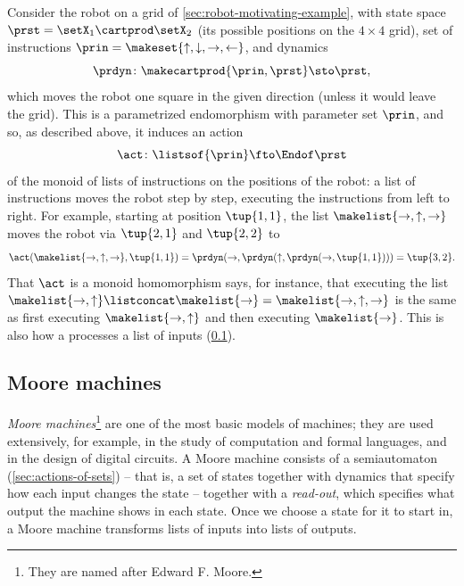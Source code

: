 \begin{example}
    \label{exa:robot-list-action}
    Consider the robot on a grid of \cref{sec:robot-motivating-example}, with state space $\prst = \setX_1 \cartprod \setX_2$ (its possible positions on the $4 \times 4$ grid), set of instructions $\prin = \makeset{\uparrow, \downarrow, \rightarrow, \leftarrow}$, and dynamics
    \begin{equation}
        \prdyn \colon \makecartprod{\prin, \prst} \sto \prst,
    \end{equation}
    which moves the robot one square in the given direction (unless it would leave the grid).
    This is a parametrized endomorphism with parameter set $\prin$, and so, as described above, it induces an action
    \begin{equation}
        \act \colon \listsof{\prin} \fto \Endof\prst
    \end{equation}
    of the monoid of lists of instructions on the positions of the robot: a list of instructions moves the robot step by step, executing the instructions from left to right.
    For example, starting at position $\tup{1,1}$, the list $\makelist{\rightarrow, \uparrow, \rightarrow}$ moves the robot via $\tup{2,1}$ and $\tup{2,2}$ to
    \begin{equation}
        \act(\makelist{\rightarrow, \uparrow, \rightarrow}, \tup{1,1})
        = \prdyn(\rightarrow, \prdyn(\uparrow, \prdyn(\rightarrow, \tup{1,1})))
        = \tup{3,2}.
    \end{equation}
    That $\act$ is a monoid homomorphism says, for instance, that executing the list $\makelist{\rightarrow, \uparrow} \listconcat \makelist{\rightarrow} = \makelist{\rightarrow, \uparrow, \rightarrow}$ is the same as first executing $\makelist{\rightarrow, \uparrow}$ and then executing $\makelist{\rightarrow}$.
    This is also how a  processes a list of inputs (\cref{sec:moore-machines}).
\end{example}


\subsection{Moore machines}
\label{sec:moore-machines}

\emph{Moore machines}\footnote{They are named after Edward F. Moore.} are one of the most basic models of machines; they are used extensively, for example, in the study of computation and formal languages, and in the design of digital circuits.
A Moore machine consists of a semiautomaton (\cref{sec:actions-of-sets}) -- that is, a set of states together with dynamics that specify how each input changes the state -- together with a \emph{read-out}, which specifies what output the machine shows in each state.
Once we choose a state for it to start in, a Moore machine transforms lists of inputs into lists of outputs.

